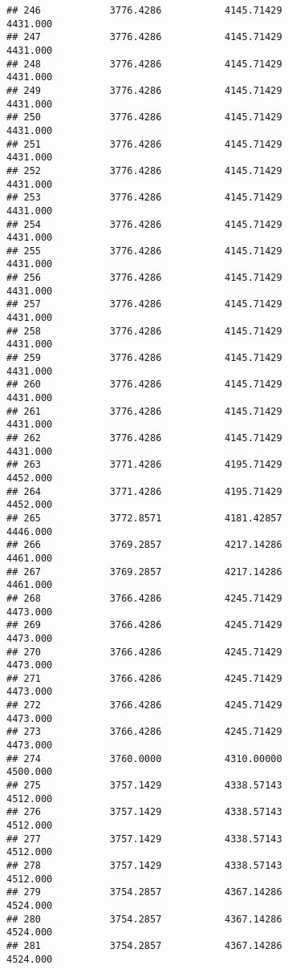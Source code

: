 \documentclass[]{article}
\begin{document}
\begin{verbatim}
## 246            3776.4286           4145.71429                4431.000
## 247            3776.4286           4145.71429                4431.000
## 248            3776.4286           4145.71429                4431.000
## 249            3776.4286           4145.71429                4431.000
## 250            3776.4286           4145.71429                4431.000
## 251            3776.4286           4145.71429                4431.000
## 252            3776.4286           4145.71429                4431.000
## 253            3776.4286           4145.71429                4431.000
## 254            3776.4286           4145.71429                4431.000
## 255            3776.4286           4145.71429                4431.000
## 256            3776.4286           4145.71429                4431.000
## 257            3776.4286           4145.71429                4431.000
## 258            3776.4286           4145.71429                4431.000
## 259            3776.4286           4145.71429                4431.000
## 260            3776.4286           4145.71429                4431.000
## 261            3776.4286           4145.71429                4431.000
## 262            3776.4286           4145.71429                4431.000
## 263            3771.4286           4195.71429                4452.000
## 264            3771.4286           4195.71429                4452.000
## 265            3772.8571           4181.42857                4446.000
## 266            3769.2857           4217.14286                4461.000
## 267            3769.2857           4217.14286                4461.000
## 268            3766.4286           4245.71429                4473.000
## 269            3766.4286           4245.71429                4473.000
## 270            3766.4286           4245.71429                4473.000
## 271            3766.4286           4245.71429                4473.000
## 272            3766.4286           4245.71429                4473.000
## 273            3766.4286           4245.71429                4473.000
## 274            3760.0000           4310.00000                4500.000
## 275            3757.1429           4338.57143                4512.000
## 276            3757.1429           4338.57143                4512.000
## 277            3757.1429           4338.57143                4512.000
## 278            3757.1429           4338.57143                4512.000
## 279            3754.2857           4367.14286                4524.000
## 280            3754.2857           4367.14286                4524.000
## 281            3754.2857           4367.14286                4524.000

\end{verbatim}
\end{document}
